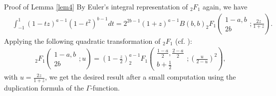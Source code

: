 \documentclass{article}
\numberwithin{equation}{section}
\newenvironment{proof*}[1]{\noindent\textbf{#1\ }}{\hspace*{\fill}$\Box$\medskip}
\begin{document}
\begin{proof*}{Proof of Lemma \ref{lem4}}
  By Euler's integral representation of $_2 F_1$ again, we have
  \begin{eqnarray}
    & \displaystyle\int_{- 1}^1 (1 - t z)^{a - 1} (1 - t^2)^{b - 1} d t = 2^{2 b - 1} (1 +
    z)^{a - 1} B (b, b)_2 F_1 \left( \begin{array}{c}
      1 - a, b\\
      2 b
    \end{array} ; \frac{2 z}{1 + z} \right) .  \label{eqn:quad} & 
  \end{eqnarray}
  Applying the following quadratic transformation of $_2 F_1$ (cf. {\cite[Thm.
  3.13]{andrews2000special}}):
  \begin{eqnarray}
    & \;_2 F_1 \left( \begin{array}{c}
      1 - a, b\\
      2 b
    \end{array} ; u \right) = \left( 1 - \frac{z}{2} \right)^{a - 1} _2 F_1
    \left( \begin{array}{c}
      \frac{1 - a}{2}, \frac{2 - a}{2}\\
      b + \frac{1}{2}
    \end{array} ; \left( \frac{u}{2 - u} \right)^2 \right), &  \nonumber
  \end{eqnarray}
  with $u = \frac{2 z}{1 + z}$, we get the desired result after a small
  computation using the duplication formula of the $\Gamma$-function.
\end{proof*}
\end{document}
